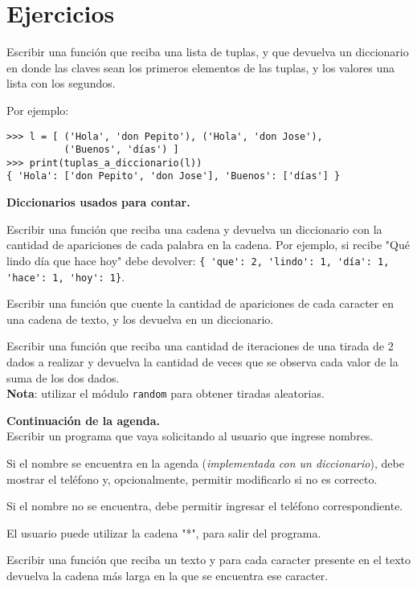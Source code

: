 \newpage
\section{Ejercicios}

\begin{ejercicio}
Escribir una función que reciba una lista de tuplas, y que devuelva
un diccionario en donde las claves sean los primeros elementos de las
tuplas, y los valores una lista con los segundos.

Por ejemplo:
\begin{lstlisting}[numbers=none]
>>> l = [ ('Hola', 'don Pepito'), ('Hola', 'don Jose'),
          ('Buenos', 'días') ]
>>> print(tuplas_a_diccionario(l))
{ 'Hola': ['don Pepito', 'don Jose'], 'Buenos': ['días'] }
\end{lstlisting}
\end{ejercicio}

\begin{ejercicio}
{\bf Diccionarios usados para contar.}
\begin{partes}
  \item Escribir una función que reciba una cadena y devuelva un diccionario con
la cantidad de apariciones de cada palabra en la cadena.  Por ejemplo, si
recibe "Qué lindo día que hace hoy" debe devolver:
\lstinline!{ 'que': 2, 'lindo': 1, 'día': 1, 'hace': 1, 'hoy': 1}!.

  \item Escribir una función que cuente la cantidad de apariciones de cada
caracter en una cadena de texto, y los devuelva en un diccionario.

  \item Escribir una función que reciba una cantidad de iteraciones de una tirada
de 2 dados a realizar y devuelva la cantidad de veces que se observa cada valor
de la suma de los dos dados. \\
{\bf Nota}: utilizar el módulo \verb!random! para obtener tiradas aleatorias.
\end{partes}
\end{ejercicio}

\begin{ejercicio}
{\bf Continuación de la agenda.} \\
Escribir un programa que vaya solicitando al usuario que ingrese nombres.
\begin{partes}
  \item Si el nombre se encuentra en la agenda ({\it implementada con un
diccionario}), debe mostrar el teléfono y, opcionalmente, permitir
modificarlo si no es correcto.
  \item Si el nombre no se encuentra, debe permitir ingresar el teléfono
correspondiente.
\end{partes}
El usuario puede utilizar la cadena "*", para salir del programa.
\end{ejercicio}

\begin{ejercicio}
Escribir una función que reciba un texto y para cada caracter presente en el
texto devuelva la cadena más larga en la que se encuentra ese caracter.
\end{ejercicio}

